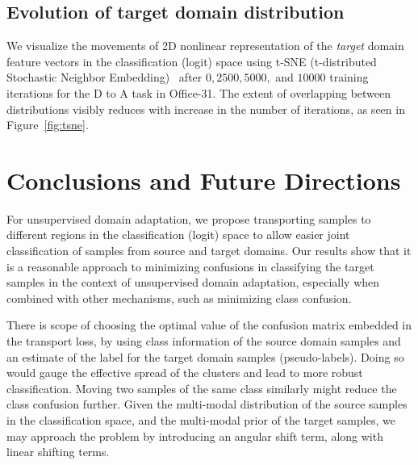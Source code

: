 \documentclass[10pt,twocolumn,letterpaper]{article}
\begin{document}
\subsection{Evolution of target domain distribution}

We visualize the movements of 2D nonlinear representation of the \emph{target} domain feature vectors in the classification (logit) space using t-SNE (t-distributed Stochastic Neighbor Embedding)~\cite{tsne} after $0, 2500, 5000,$ and $10000$ training iterations for the D to A task in Office-31. The extent of overlapping between distributions visibly reduces with increase in the number of iterations, as seen in Figure~\ref{fig:tsne}.

\section{Conclusions and Future Directions}

For unsupervised domain adaptation, we propose transporting samples to different regions in the classification (logit) space to allow easier joint classification of samples from source and target domains. Our results show that it is a reasonable approach to minimizing confusions in classifying the target samples in the context of unsupervised domain adaptation, especially when combined with other mechanisms, such as minimizing class confusion.

There is scope of choosing the optimal value of the confusion matrix embedded in the transport loss, by using class information of the source domain samples and an estimate of the label for the target domain samples (pseudo-labels). Doing so would gauge the effective spread of the clusters and lead to more robust classification. Moving two samples of the same class similarly might reduce the class confusion further. Given the multi-modal distribution of the source samples in the classification space, and the multi-modal prior of the target samples, we may approach the problem by introducing an angular shift term, along with linear shifting terms. 
{\small


}
 
\end{document}
